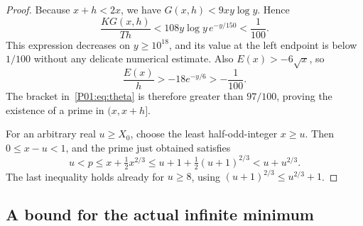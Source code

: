 \documentclass[11pt,a4paper]{article}
\theoremstyle{definition}\newtheorem{definition}[theorem]{Definition}
\theoremstyle{remark}\newtheorem{remark}[theorem]{Remark}
\begin{document}
\begin{proof}
Because $x+h<2x$, we have $G(x,h)<9xy\log y$. Hence
\[
 \frac{KG(x,h)}{Th}
       <108y\log y\,e^{-y/150}<\frac1{100}.
\]
This expression decreases on $y\geq10^{18}$, and its value at the
left endpoint is below $1/100$ without any delicate numerical estimate.
Also $E(x)>-6\sqrt x$, so
\[
                  \frac{E(x)}h>-18e^{-y/6}>-\frac1{100}.
\]
The bracket in~\eqref{P01:eq:theta} is therefore greater than $97/100$,
proving the existence of a prime in $(x,x+h]$.

For an arbitrary real $u\geq X_0$, choose the least half-odd-integer
$x\geq u$. Then $0\leq x-u<1$, and the prime just obtained satisfies
\[
 u<p\leq x+\tfrac12x^{2/3}
       \leq u+1+\tfrac12(u+1)^{2/3}<u+u^{2/3}.
\]
The last inequality holds already for $u\geq8$, using
$(u+1)^{2/3}\leq u^{2/3}+1$.
\end{proof}

\subsection{A bound for the actual infinite minimum}\label{P01:sec:upper}
\end{document}
